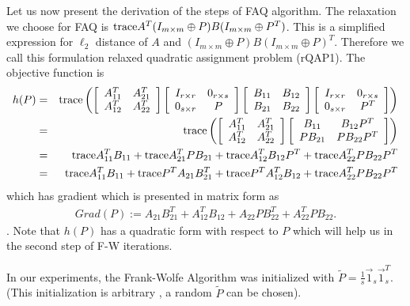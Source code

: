 \documentclass[12pt,oneside,final]{thesis}\usepackage[]{graphicx}\usepackage[]{color}
\begin{document}
Let us now present the derivation of the steps of  FAQ algorithm.  The relaxation we choose for FAQ is $\textup{trace} {A^T(I_{m \times m}\oplus P)B(I_{m \times m}\oplus P^T)}$. This is a simplified expression for $\ell_2$ distance of $A$ and $(I_{m \times m}\oplus P)B(I_{m \times m}\oplus P)^T$. Therefore we call this formulation relaxed quadratic assignment problem (rQAP1).
The objective function is
\begin{eqnarray*}  h(P)  & =  &   \textup{trace} \left (
\left [  \begin{array}{cc}  A^T_{11} & A^T_{21} \\ A^T_{12} & A^T_{22}  \end{array} \right ]
\left [  \begin{array}{cc}  I_{r \times r} & 0_{r \times s}
\\ 0_{s \times r} & P  \end{array} \right ]
\left [  \begin{array}{cc}  B_{11} & B_{12} \\ B_{21} & B_{22}  \end{array} \right ]
\left [  \begin{array}{cc}  I_{r \times r} & 0_{r \times s}
\\ 0_{s \times r} & P^T  \end{array} \right ]
\right ) \\
& = & \textup{trace} \left (
\left [  \begin{array}{cc}  A^T_{11} & A^T_{21} \\ A^T_{12} & A^T_{22}  \end{array} \right ]
\left [  \begin{array}{cc}  B_{11} & B_{12}P^T \\ PB_{21} & PB_{22}P^T  \end{array} \right ]
\right )\\
& = & \textup{trace} A_{11}^TB_{11}+ \textup{trace} A_{21}^TPB_{21}+\textup{trace} A_{12}^TB_{12}P^T
+ \textup{trace} A_{22}^TPB_{22}P^T \\
& = &  \textup{trace} A_{11}^TB_{11}+ \textup{trace} P^T A_{21}B_{21}^T+\textup{trace} P^TA_{12}^TB_{12}
+ \textup{trace} A_{22}^TPB_{22}P^T
\end{eqnarray*}
which has gradient which is presented in matrix form as 
\begin{eqnarray*}
Grad(P):=A_{21}B_{21}^T+A_{12}^TB_{12}+A_{22}PB_{22}^T+A_{22}^TPB_{22} .
\end{eqnarray*}. Note that $h(P)$ has a quadratic form with respect to $P$ which will help us in the second step of F-W iterations.


In our experiments,  the Frank-Wolfe Algorithm was initialized with
$\tilde{P}=\frac{1}{s}\vec{1}_{s} \vec{1}_{s}^T$. (This initialization is arbitrary , a random $\tilde{P}$ can be chosen). 
\end{document}
